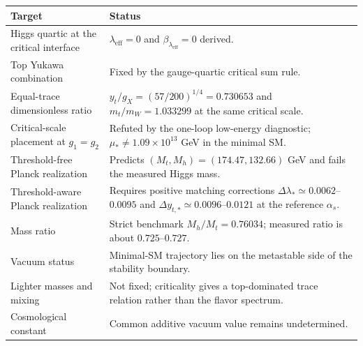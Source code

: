 \begin{remark}
\begin{center}
\small
\begin{tabularx}{\textwidth}{l Y}
\toprule
Target & Status \\
\midrule
Higgs quartic at the critical interface
& $\lambda_{\mathrm{eff}}=0$ and $\beta_{\lambda_{\mathrm{eff}}}=0$ derived. \\
Top Yukawa combination
& Fixed by the gauge-quartic critical sum rule. \\
Equal-trace dimensionless ratio
& $y_t/g_X=(57/200)^{1/4}=0.730653$ and $m_t/m_W=1.033299$ at the same critical scale. \\
Critical-scale placement at $g_1=g_2$
& Refuted by the one-loop low-energy diagnostic; $\mu_*\ne1.09\times10^{13}$ GeV in the minimal SM. \\
Threshold-free Planck realization
& Predicts $(M_t,M_h)=(174.47,132.66)$ GeV and fails the measured Higgs mass. \\
Threshold-aware Planck realization
& Requires positive matching corrections $\Delta\lambda_*\simeq0.0062$--$0.0095$ and $\Delta y_{t,*}\simeq0.0096$--$0.0121$ at the reference $\alpha_s$. \\
Mass ratio
& Strict benchmark $M_h/M_t=0.76034$; measured ratio is about $0.725$--$0.727$. \\
Vacuum status
& Minimal-SM trajectory lies on the metastable side of the stability boundary. \\
Lighter masses and mixing
& Not fixed; criticality gives a top-dominated trace relation rather than the flavor spectrum. \\
Cosmological constant
& Common additive vacuum value remains undetermined. \\
\bottomrule
\end{tabularx}
\end{center}
\end{remark}
